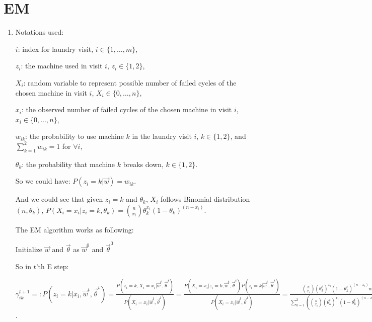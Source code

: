 \documentclass[paper=letter, fontsize=12pt]{article}
\begin{document}
\section{EM}
\begin{enumerate}[label=(\alph*)]
	\item Notations used:
	
	$i$: index for laundry visit, $i \in \{1, \dots, m\}$,
	
	$z_i$: the machine used in visit $i$, $z_i \in \{1, 2\}$,
	
	$X_i$: random variable to represent possible number of failed cycles of the chosen machine in visit $i$, $X_i \in \{0, \dots, n\}$,
	
	$x_i$: the observed number of failed cycles of the chosen machine in visit $i$, $x_i \in \{0, \dots, n\}$,
	
	$w_{ik}$: the probability to use machine $k$ in the laundry visit $i$, $k \in \{1, 2\}$, and $\sum_{k = 1}^{2} w_{ik} = 1$ for $\forall i$,
	
	$\theta_k$: the probability that machine $k$ breaks down, $k \in \{1, 2\}$.
	
	So we could have: $P(z_i = k | \vec{w}) = w_{ik}$.
	
	And we could see that given $z_i = k$ and $\theta_{k}$, $X_i$ follows Binomial distribution $(n, \theta_{k})$, $P(X_i = x_i | z_i = k, \theta_k) = \binom{n}{x_i} \theta_k^{x_{i}} (1-\theta_k)^{(n-x_{i})}$.
	
	The EM algorithm works as following:
	
	\begin{algorithm}[H]
		Initialize $\vec{w}$ and $\vec{\theta}$ as $\vec{w}^0$ and $\vec{\theta}^0$\;
	\end{algorithm}
	
	So in $t$'th E step:
	
	$\gamma_{ik}^{t+1} =: P(z_i = k | x_i, \vec{w}^t, \vec{\theta}^t) = \frac{P(z_i = k, X_i = x_i | \vec{w}^t, \vec{\theta}^t)}{P(X_i = x_i | \vec{w}^t, \vec{\theta}^t)} = \frac{P(X_i = x_i | z_i = k, \vec{w}^t, \vec{\theta}^t) P(z_i = k | \vec{w}^t, \vec{\theta}^t)}{P(X_i = x_i | \vec{w}^t, \vec{\theta}^t)} = \frac{\binom{n}{x_i} {(\theta_k^t)}^{x_{i}} {(1-\theta_k^t)}^{(n-x_{i})} w_{ik}^t}{\sum_{k = 1}^{2}(\binom{n}{x_i} {(\theta_k^t)}^{x_{i}} {(1-\theta_k^t)}^{(n-x_{i})} w_{ik}^t) } = \frac{ {(\theta_k^t)}^{x_{i}} {(1-\theta_k^t)}^{(n-x_{i})} w_{ik}^t}{\sum_{k = 1}^{2}( {(\theta_k^t)}^{x_{i}} {(1-\theta_k^t)}^{(n-x_{i})} w_{ik}^t) }$.
	

\end{enumerate}
\end{document}
